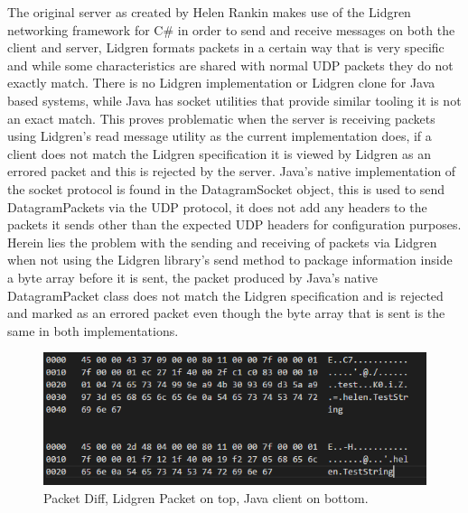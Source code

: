\documentclass{article}
\begin{document}
The original server as created by Helen Rankin makes use of the Lidgren networking framework for C\# in order to send and receive messages on both the client and server, Lidgren formats packets in a certain way that is very specific and while some characteristics are shared with normal UDP packets they do not exactly match. There is no Lidgren implementation or Lidgren clone for Java based systems, while Java has socket utilities that provide similar tooling it is not an exact match. This proves problematic when the server is receiving packets using Lidgren’s read message utility as the current implementation does, if a client does not match the Lidgren specification it is viewed by Lidgren as an errored packet and this is rejected by the server. Java’s native implementation of the socket protocol is found in the DatagramSocket object, this is used to send DatagramPackets via the UDP protocol, it does not add any headers to the packets it sends other than the expected UDP headers for configuration purposes. Herein lies the problem with the sending and receiving of packets via Lidgren when not using the Lidgren library’s send method to package information inside a byte array before it is sent, the packet produced by Java’s native DatagramPacket class does not match the Lidgren specification and is rejected and marked as an errored packet even though the byte array that is sent is the same in both implementations. \\
\begin{figure}[H]
	\caption{Packet Diff, Lidgren Packet on top, Java client on bottom.}
	\centering
	\includegraphics{packetdiff.png}
\end{figure}
\end{document}
